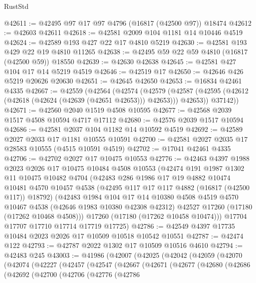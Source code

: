 \begin{lexlean}{RustStd}
\begin{coremodule}
{\begin{coremodule}
{{{{{{{{{{{{{{{{{{{{{{{{{{{{{{{{{{{{{{{{{{{{{{{{{{{{{{{@42611 := @42495 @97 @17 @97 @4796 (@16817 (@42500 @97)) @18474
@42612 := @42603 @42611
@42618 := @42581 @2009 @104 @1181 @14 @10446 @4519
@42624 := @42589 @193 @427 @22 @17 @4810 @5219
@42630 := @42581 @193 @429 @22 @19 @4810 @11265
@42638 := @42495 @59 @22 @59 @4810 (@16817 (@42500 @59)) @18550
@42639 := @42630 @42638
@42645 := @42581 @427 @104 @17 @14 @5219 @4519
@42646 := @42519 @17
@42650 := @42646 @426 @5219 @20626 @20630
@42651 := @42645 @42650
@42653 := @16834 @42461 @4335
@42667 := @42559
    (@42564
      (@42574
        (@42579 (@42587 (@42595 (@42612 (@42618 (@42624 (@42639 (@42651 @42653))) @42653))) @42653))
        @37142))
@42671 := @42560 @2040 @1519 @4508 @10595
@42677 := @42568 @2039 @1517 @4508 @10594 @4717 @17112
@42680 := @42576 @2039 @1517 @10594
@42686 := @42581 @2037 @104 @1182 @14 @10592 @4519
@42692 := @42589 @2027 @2033 @17 @1181 @10555 @10591
@42700 := @42581 @2027 @2035 @17 @28583 @10555 (@4515 @10591 @4519)
@42702 := @17041 @42461 @4335
@42706 := @42702 @2027 @17 @10475 @10553
@42776 := @42463
    @4397
    @1988
    @2023
    @2026
    @17
    @10475
    @10484
    @4508
    @10553
    (@42474
      @191
      @1987
      @1302
      @11
      @10475
      @10482
      @4704
      (@42483
        @286
        @1986
        @17
        @19
        @4882
        @10474
        @10481
        @4570
        @10457
        @4538
        (@42495 @117 @17 @117 @4882 (@16817 (@42500 @117)) @18792)
        (@42483
          @1984
          @104
          @17
          @14
          @10380
          @4508
          @4519
          @4570
          @10467
          @4538
          (@42646 @1983 @10380 @42308 @42312)
          @42527
          @17260
          (@17180 (@17262 @10468 @4508)))
        @17260
        (@17180 (@17262 @10458 @10474)))
      @17704
      @17707
      @17710
      @17714
      @17719
      @17725)
@42786 := @42549 @4397 @17735 @10484 @2023 @2026 @17 @10509 @10518 @10542 @10551
@42787 := @42474 @122
@42793 := @42787 @2022 @1302 @17 @10509 @10516 @4610
@42794 := @42483 @245
@43003 := @41986
    (@42007
      (@42025
        (@42042
          (@42059
            (@42070
              (@42074
                (@42227
                  (@42457
                    (@42547
                      (@42667
                        (@42671
                          (@42677
                            (@42680
                              (@42686
                                (@42692
                                  (@42700
                                    (@42706
                                      (@42776
                                        (@42786
}}}}}}}}}}}}}}}}}}}}}}}}}}}}}}}}}}}}}}}}}}}}}}}}}}}}}}}
\end{coremodule}}
\end{coremodule}
\end{lexlean}
